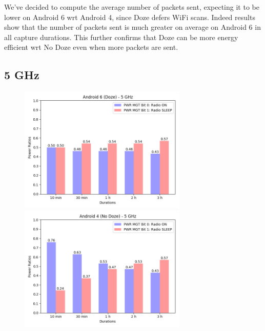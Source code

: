 \documentclass[11pt, a4paper]{article}
\begin{document}
        We've decided to compute the average number of packets sent, expecting it to be lower on Android 6 wrt Android 4, since Doze defers WiFi scans. Indeed results show that the number of packets sent is much greater on average on Android 6 in all capture durations. This further confirms that Doze can be more energy efficient wrt No Doze even when more packets are sent.

    \subsection{5 GHz}
    
        \begin{figure}[ht]
           \centerline{
              \includegraphics[width=8cm]{04_doze6_pwr_5.png}
              \hfill
              \includegraphics[width=8cm]{05_nodoze4_pwr_5.png}
           }
        \end{figure}
\end{document}
